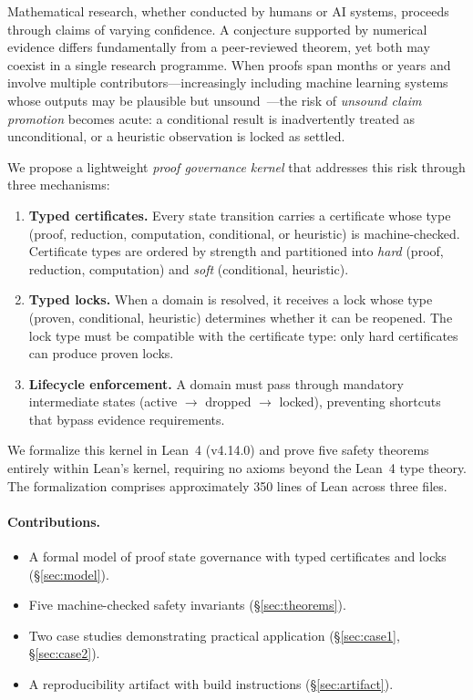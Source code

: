 \documentclass[runningheads]{llncs}
\begin{document}
Mathematical research, whether conducted by humans or AI systems, proceeds
through claims of varying confidence. A conjecture supported by numerical
evidence differs fundamentally from a peer-reviewed theorem, yet both may
coexist in a single research programme. When proofs span months or years and
involve multiple contributors---increasingly including machine
learning systems whose outputs may be plausible but
unsound~\cite{FarrugiaEtAl2024}---the risk of \emph{unsound claim
promotion} becomes acute: a conditional result is inadvertently
treated as unconditional, or a heuristic observation is locked
as settled.

We propose a lightweight \emph{proof governance kernel} that addresses this
risk through three mechanisms:

\begin{enumerate}
\item \textbf{Typed certificates.} Every state transition carries a certificate
  whose type (proof, reduction, computation, conditional, or heuristic) is
  machine-checked. Certificate types are ordered by strength and partitioned
  into \emph{hard} (proof, reduction, computation) and \emph{soft}
  (conditional, heuristic).

\item \textbf{Typed locks.} When a domain is resolved, it receives a lock whose
  type (proven, conditional, heuristic) determines whether it can be reopened.
  The lock type must be compatible with the certificate type: only hard
  certificates can produce proven locks.

\item \textbf{Lifecycle enforcement.} A domain must pass through mandatory
  intermediate states (active $\to$ dropped $\to$ locked), preventing shortcuts
  that bypass evidence requirements.
\end{enumerate}

\noindent
We formalize this kernel in Lean~4 (v4.14.0) and prove five safety theorems
entirely within Lean's kernel, requiring no axioms beyond the Lean~4 type
theory. The formalization comprises approximately 350 lines of Lean across
three files.

\paragraph{Contributions.}
\begin{itemize}
\item A formal model of proof state governance with typed certificates
  and locks (\S\ref{sec:model}).
\item Five machine-checked safety invariants (\S\ref{sec:theorems}).
\item Two case studies demonstrating practical application
  (\S\ref{sec:case1}, \S\ref{sec:case2}).
\item A reproducibility artifact with build instructions (\S\ref{sec:artifact}).
\end{itemize}
\end{document}
